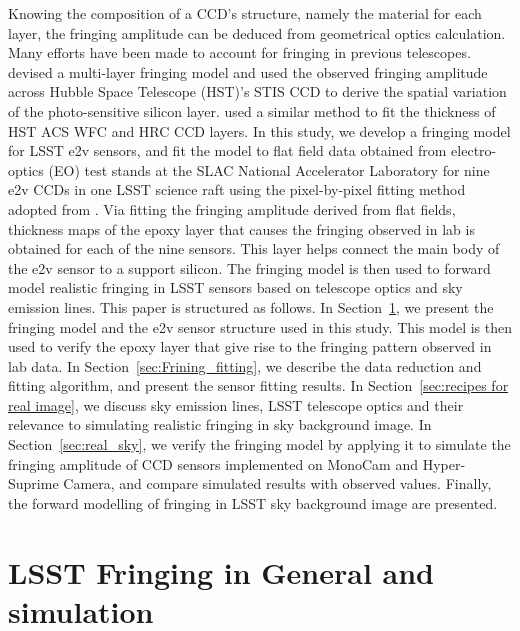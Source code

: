 \documentclass[twocolumn]{aastex63} %
\begin{document}
\begin{CJK*}{UTF8}{gbsn}
Knowing the composition of a CCD's structure, namely the material for each layer, the fringing amplitude can be deduced from geometrical optics calculation. Many efforts have been made to account for fringing in previous telescopes. \citet{Malumuth03} devised a multi-layer fringing model and used the observed fringing amplitude across Hubble Space Telescope (HST)'s STIS CCD to derive the spatial variation of the photo-sensitive silicon layer. \citet{Walsh03} used a similar method to fit the thickness of HST ACS WFC and HRC CCD layers. In this study, we develop a fringing model for LSST e2v sensors, and fit the model to flat field data obtained from electro-optics (EO) test stands at the SLAC National Accelerator Laboratory for nine e2v CCDs in one LSST science raft using the pixel-by-pixel fitting method adopted from \citet{Malumuth03}. Via fitting the fringing amplitude derived from flat fields, thickness maps of the epoxy layer that causes the fringing observed in lab is obtained for each of the nine sensors. This layer helps connect the main body of the e2v sensor to a support silicon. The fringing model is then used to forward model realistic fringing in LSST sensors based on telescope optics and sky emission lines. This paper is structured as follows. In Section~\ref{sec: LSST_fringe_general}, we present the fringing model and the e2v sensor structure used in this study.  This model is then used to verify the epoxy layer that give rise to the fringing pattern observed in lab data. In Section~\ref{sec:Frining_fitting}, we describe the data reduction and fitting algorithm, and present the sensor fitting results. In Section~\ref{sec:recipes for real image}, we discuss sky emission lines, LSST telescope optics and their relevance to  simulating realistic fringing in sky background image. In Section~\ref{sec:real_sky}, we verify the fringing model by applying it to simulate the fringing amplitude of CCD sensors  implemented on MonoCam and Hyper-Suprime Camera, and compare simulated results with observed values. Finally, the forward modelling of fringing in LSST sky background image are presented. 

 
\section{LSST Fringing in General and simulation} \label{sec: LSST_fringe_general}


\end{CJK*}
\end{document}
